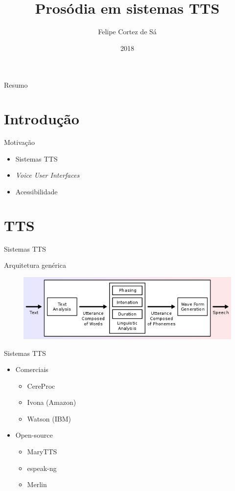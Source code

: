 \documentclass{beamer}
\title{Prosódia em sistemas TTS}
\author{Felipe Cortez de Sá}
\date{2018}
\institute{UFRN}
\begin{document}
\begin{frame}
  \titlepage
\end{frame}

\begin{frame}{Resumo}
  \tableofcontents
\end{frame}

\section{Introdução}
\begin{frame}{Motivação}
  \begin{itemize}
    \item Sistemas TTS
    \item \emph{Voice User Interfaces}
    \item Acessibilidade
  \end{itemize}
\end{frame}

\section{TTS}
\begin{frame}{Sistemas TTS}
  \begin{block}{Arquitetura genérica}
    \begin{figure}
      \includegraphics[scale=0.55]{tts-system.png}
    \end{figure}
  \end{block}
\end{frame}

\begin{frame}{Sistemas TTS}
  \begin{itemize}
    \item Comerciais
      \begin{itemize}
        \item CereProc
        \item Ivona (Amazon)
        \item Watson (IBM)
      \end{itemize}
    \item Open-source
      \begin{itemize}
        \item MaryTTS
        \item espeak-ng
        \item Merlin
      \end{itemize}
  \end{itemize}
\end{frame}
\end{document}
